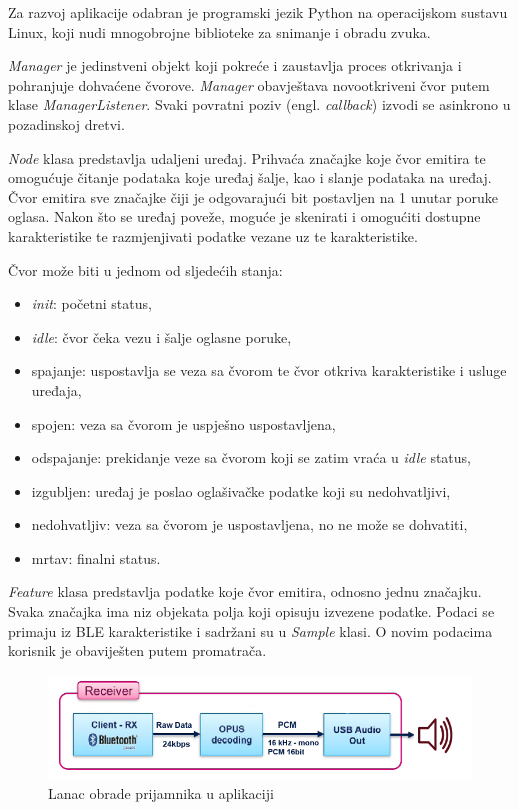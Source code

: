 Za razvoj aplikacije odabran je programski jezik Python na operacijskom sustavu Linux, koji nudi mnogobrojne biblioteke za snimanje i obradu zvuka. 

\textit{Manager} je jedinstveni objekt koji pokreće i zaustavlja proces otkrivanja i pohranjuje dohvaćene čvorove. \textit{Manager} obavještava novootkriveni čvor putem klase \textit{ManagerListener}. Svaki povratni poziv (engl. \textit{callback}) izvodi se asinkrono u pozadinskoj dretvi. 

\textit{Node} klasa predstavlja udaljeni uređaj. Prihvaća značajke koje čvor emitira te omogućuje čitanje podataka koje uređaj šalje, kao i slanje podataka na uređaj. Čvor emitira sve značajke čiji je odgovarajući bit postavljen na 1 unutar poruke oglasa. Nakon što se uređaj poveže, moguće je skenirati i omogućiti dostupne karakteristike te razmjenjivati podatke vezane uz te karakteristike. 

Čvor može biti u jednom od sljedećih stanja:
\begin{itemize}
	\item \textit{init}: početni status,
	\item \textit{idle}: čvor čeka vezu i šalje oglasne poruke,
	\item spajanje: uspostavlja se veza sa čvorom te čvor otkriva karakteristike i usluge uređaja,
	\item spojen: veza sa čvorom je uspješno uspostavljena, 
	\item odspajanje: prekidanje veze sa čvorom koji se zatim vraća u \textit{idle} status, 
	\item izgubljen: uređaj je poslao oglašivačke podatke koji su nedohvatljivi,
	\item nedohvatljiv: veza sa čvorom je uspostavljena, no ne može se dohvatiti, 
	\item mrtav: finalni status.
\end{itemize}

\textit{Feature} klasa predstavlja podatke koje čvor emitira, odnosno jednu značajku. Svaka značajka ima niz objekata polja koji opisuju izvezene podatke. Podaci se primaju iz BLE karakteristike i sadržani su u \textit{Sample} klasi. O novim podacima korisnik je obaviješten putem promatrača.

\begin{figure}[ht]
	\includegraphics[width=\linewidth]{imgs/duplex_chain_2}
	\caption{Lanac obrade prijamnika u aplikaciji}
	\label{fig:duplex_chain_2}
\end{figure}